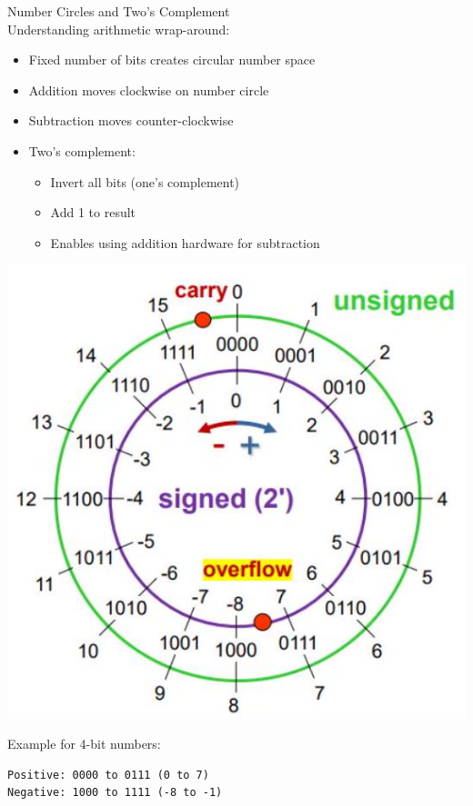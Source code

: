 \begin{concept}{Number Circles and Two's Complement}\\
Understanding arithmetic wrap-around:
\begin{itemize}
  \item Fixed number of bits creates circular number space
  \item Addition moves clockwise on number circle
  \item Subtraction moves counter-clockwise
  \item Two's complement:
    \begin{itemize}
      \item Invert all bits (one's complement)
      \item Add 1 to result
      \item Enables using addition hardware for subtraction
    \end{itemize}
\end{itemize}
\includegraphics[width=0.6\linewidth]{images/2024_12_29_79e6b22f503fb7b4f718g-04(2)}

Example for 4-bit numbers:
\begin{verbatim}
Positive: 0000 to 0111 (0 to 7)
Negative: 1000 to 1111 (-8 to -1)
\end{verbatim}
\end{concept}


